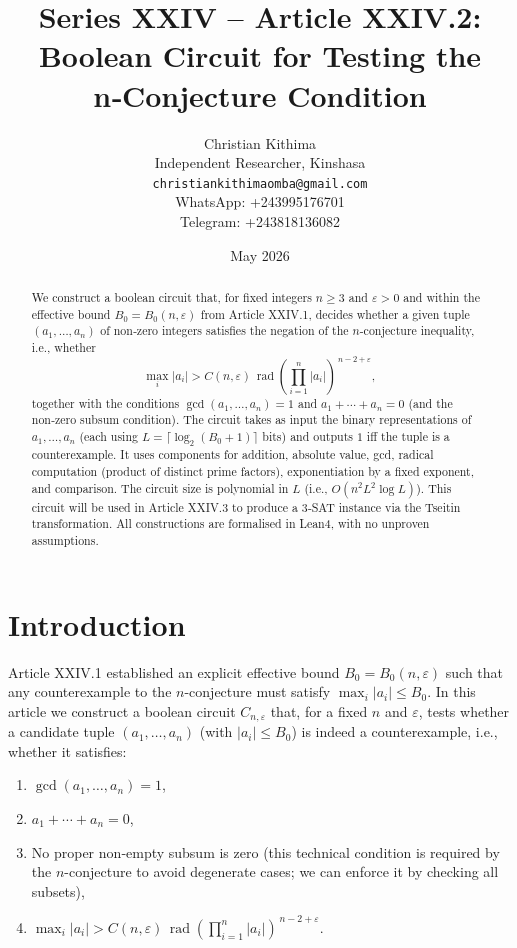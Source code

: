 \documentclass[11pt,a4paper]{article}
\title{Series XXIV – Article XXIV.2: Boolean Circuit for Testing the n‑Conjecture Condition}
\author{Christian Kithima \\
Independent Researcher, Kinshasa \\
\texttt{christiankithimaomba@gmail.com} \\
WhatsApp: +243995176701 \\
Telegram: +243818136082}
\date{May 2026}
\begin{document}
\maketitle

\begin{abstract}
We construct a boolean circuit that, for fixed integers $n\ge 3$ and $\varepsilon>0$ and within the effective bound $B_0 = B_0(n,\varepsilon)$ from Article XXIV.1, decides whether a given tuple $(a_1,\dots,a_n)$ of non‑zero integers satisfies the negation of the $n$-conjecture inequality, i.e., whether
\[
\max_i |a_i| > C(n,\varepsilon)\,\operatorname{rad}\!\left(\prod_{i=1}^n |a_i|\right)^{\,n-2+\varepsilon},
\]
together with the conditions $\gcd(a_1,\dots,a_n)=1$ and $a_1+\cdots+a_n=0$ (and the non‑zero subsum condition). The circuit takes as input the binary representations of $a_1,\dots,a_n$ (each using $L = \lceil \log_2(B_0+1)\rceil$ bits) and outputs $1$ iff the tuple is a counterexample. It uses components for addition, absolute value, gcd, radical computation (product of distinct prime factors), exponentiation by a fixed exponent, and comparison. The circuit size is polynomial in $L$ (i.e., $O(n^2 L^2 \log L)$). This circuit will be used in Article XXIV.3 to produce a 3‑SAT instance via the Tseitin transformation. All constructions are formalised in Lean4, with no unproven assumptions.
\end{abstract}

\tableofcontents

\section{Introduction}
Article XXIV.1 established an explicit effective bound $B_0 = B_0(n,\varepsilon)$ such that any counterexample to the $n$-conjecture must satisfy $\max_i |a_i| \le B_0$. In this article we construct a boolean circuit $C_{n,\varepsilon}$ that, for a fixed $n$ and $\varepsilon$, tests whether a candidate tuple $(a_1,\dots,a_n)$ (with $|a_i|\le B_0$) is indeed a counterexample, i.e., whether it satisfies:
\begin{enumerate}
\item $\gcd(a_1,\dots,a_n)=1$,
\item $a_1+\cdots+a_n=0$,
\item No proper non‑empty subsum is zero (this technical condition is required by the $n$-conjecture to avoid degenerate cases; we can enforce it by checking all subsets),
\item $\max_i |a_i| > C(n,\varepsilon)\,\operatorname{rad}\!\left(\prod_{i=1}^n |a_i|\right)^{\,n-2+\varepsilon}$.
\end{enumerate}
\end{document}
